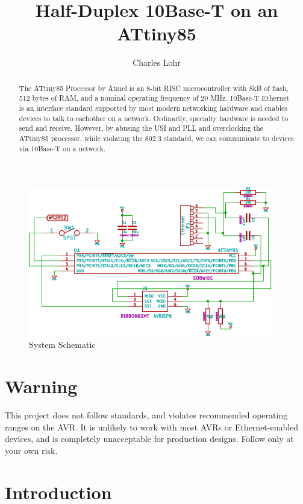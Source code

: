 \documentclass[13pt]{ltxdoc}
\begin{document}
\title{Half-Duplex 10Base-T on an ATtiny85}
\author{Charles Lohr}
\maketitle



\begin{abstract}
The ATtiny85 Processor by Atmel is an 8-bit RISC microcontroller with 8kB of 
flash, 512 bytes of RAM, and a nominal operating frequency of 20 MHz.
10Base-T Ethernet is an interface standard supported by most modern networking
hardware and enables devices to talk to eachother on a network.  Ordinarily,
specialty hardware is needed to send and receive.  However, by abusing
the USI and PLL and overclocking the ATtiny85 processor, while violating the 802.3 standard, we can communicate to devices via 10Base-T on a network.
\end{abstract}

\begin{figure}[ht]
    \centering
    \includegraphics[width=4.2in]{schematic}
    \caption{System Schematic}
	\label{fig:schematic}
\end{figure}

\section*{Warning}
This project does not follow standards, and violates recommended operating ranges on the AVR.  It is unlikely
to work with most AVRs or Ethernet-enabled devices, and is completely unacceptable for production designs.
Follow only at your own risk.
\pagebreak
\section{Introduction}
\end{document}
